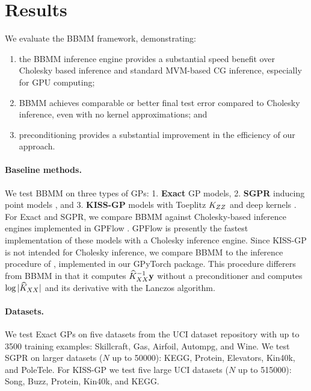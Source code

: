 \section{Results}
\label{sec:bbmm_results}

We evaluate the BBMM framework, demonstrating:
\begin{enumerate}
	\item the BBMM inference engine provides a substantial speed benefit over Cholesky based inference and standard MVM-based CG inference, especially for GPU computing;
	\item BBMM achieves comparable or better final test error compared to Cholesky inference, even with no kernel approximations; and
	\item preconditioning provides a substantial improvement in the efficiency of our approach.
\end{enumerate}

\paragraph{Baseline methods.}
We test BBMM on three types of GPs:
1. {\bf Exact} GP models,
2. {\bf SGPR} inducing point models \cite{titsias2009variational,hensman2013gaussian},
and 3. {\bf KISS-GP} models with Toeplitz $K_{ZZ}$ and deep kernels \cite{wilson2015kernel,wilson2016deep}.
For Exact and SGPR, we compare BBMM against Cholesky-based inference engines implemented in GPFlow \cite{matthews2017gpflow}.
GPFlow is presently the fastest implementation of these models with a Cholesky inference engine.
Since KISS-GP is not intended for Cholesky inference, we compare BBMM to the inference procedure of \citet{dong2017scalable}, implemented in our GPyTorch package.
This procedure differers from BBMM in that it computes $\widehat{K}_{XX}^{-1} \mathbf{y}$ without a preconditioner and computes $\log \vert \widehat{K}_{XX} \vert$ and its derivative with the Lanczos algorithm.

\paragraph{Datasets.}
We test Exact GPs on five datasets from the UCI dataset repository \cite{asuncion2007uci} with up to 3500 training examples: Skillcraft, Gas, Airfoil, Autompg, and Wine.
We test SGPR on larger datasets ($N$ up to 50000): KEGG, Protein, Elevators, Kin40k, and PoleTele.
For KISS-GP we test five large UCI datasets ($N$ up to 515000): Song, Buzz, Protein, Kin40k, and KEGG.

